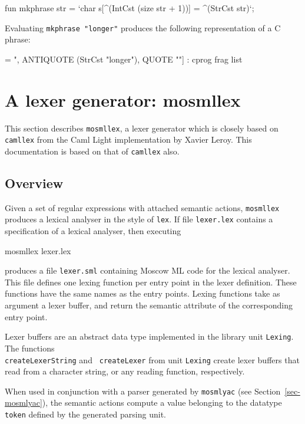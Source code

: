 \documentclass[fleqn,a4paper]{article}
\begin{document}
\begin{program}
fun mkphrase str = `char s[^(IntCst (size str + 1))] = ^(StrCst str)`;
\end{program}

\noindent Evaluating {\tt mkphrase "longer"} produces the following
representation of a C phrase:

\begin{program}
[QUOTE "char s[", ANTIQUOTE (IntCst 7), QUOTE "] = ", 
 ANTIQUOTE (StrCst "longer"), QUOTE ""] : cprog frag list
\end{program}


\newpage

\section{A lexer generator: mosmllex}
\label{sec-mosmllex}

This section describes {\tt mosmllex}, a lexer generator which is
closely based on {\tt camllex} from the Caml Light implementation by
Xavier Leroy.  This documentation is based on that of {\tt camllex}
also.  


\subsection{Overview}

Given a set of regular expressions with attached semantic actions,
{\tt mosmllex} produces a lexical analyser in the style of {\tt lex}.
If file {\tt lexer.lex} contains a specification of a lexical
analyser, then executing

\begin{program}
mosmllex lexer.lex  
\end{program}

\noindent produces a file {\tt lexer.sml} containing Moscow ML code
for the lexical analyser.  This file defines one lexing function per
entry point in the lexer definition.  These functions have the same
names as the entry points.  Lexing functions take as argument a lexer
buffer, and return the semantic attribute of the corresponding entry
point.

Lexer buffers are an abstract data type implemented in the library
unit {\tt Lexing}.  The functions\\ {\tt createLexerString} and {\tt
  createLexer} from unit {\tt Lexing} create lexer buffers that read
from a character string, or any reading function, respectively.

When used in conjunction with a parser generated by {\tt mosmlyac}
(see Section~\ref{sec-mosmlyac}), the semantic actions compute a value
belonging to the datatype {\tt token} defined by the generated parsing
unit.
\end{document}
